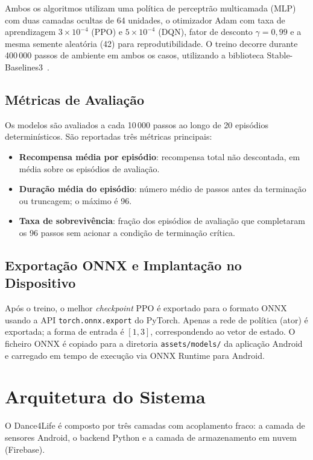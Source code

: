 \documentclass[runningheads]{llncs}
\begin{document}
Ambos os algoritmos utilizam uma política de perceptrão multicamada (MLP) com duas
camadas ocultas de 64 unidades, o otimizador Adam com taxa de aprendizagem
$3 \times 10^{-4}$ (PPO) e $5 \times 10^{-4}$ (DQN), fator de desconto
$\gamma = 0{,}99$ e a mesma semente aleatória (42) para reprodutibilidade. O treino
decorre durante 400\,000 passos de ambiente em ambos os casos, utilizando a
biblioteca Stable-Baselines3~\cite{raffin2021}.

\subsection{Métricas de Avaliação}

Os modelos são avaliados a cada 10\,000 passos ao longo de 20 episódios
determinísticos. São reportadas três métricas principais:
\begin{itemize}
  \item \textbf{Recompensa média por episódio}: recompensa total não descontada,
        em média sobre os episódios de avaliação.
  \item \textbf{Duração média do episódio}: número médio de passos antes da
        terminação ou truncagem; o máximo é 96.
  \item \textbf{Taxa de sobrevivência}: fração dos episódios de avaliação que
        completaram os 96 passos sem acionar a condição de terminação crítica.
\end{itemize}

\subsection{Exportação ONNX e Implantação no Dispositivo}

Após o treino, o melhor \emph{checkpoint} PPO é exportado para o formato ONNX
usando a API \texttt{torch.onnx.export} do PyTorch. Apenas a rede de política
(ator) é exportada; a forma de entrada é $[1, 3]$, correspondendo ao vetor de
estado. O ficheiro ONNX é copiado para a diretoria \texttt{assets/models/} da
aplicação Android e carregado em tempo de execução via ONNX Runtime para Android.

%
\section{Arquitetura do Sistema}
\label{sec:arch}

O Dance4Life é composto por três camadas com acoplamento fraco: a camada de
sensores Android, o backend Python e a camada de armazenamento em nuvem (Firebase).
\end{document}
